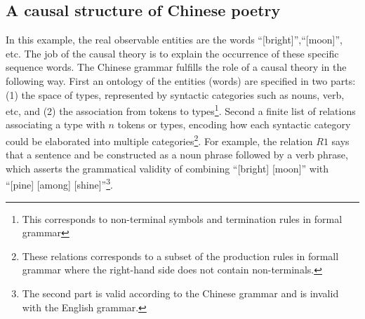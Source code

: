 \subsection{A causal structure of Chinese poetry}

In this example, the real observable entities are the words ``[bright]'',``[moon]'', etc. The job of the causal theory is to explain the occurrence of these specific sequence words. The Chinese grammar fulfills the role of a causal theory in the following way. First an ontology of the entities (words) are specified in two parts: (1) the space of types, represented by syntactic categories such as nouns, verb, etc, and (2) the association from tokens to types\footnote{This corresponds to non-terminal symbols and termination rules in formal grammar}. Second a finite list of relations associating a type with $n$ tokens or types, encoding how each syntactic category could be elaborated into multiple categories\footnote{These relations corresponds to a subset of the production rules in formall grammar where the right-hand side does not contain non-terminals.}. For example, the relation $R1$ says that a sentence and be constructed as a noun phrase followed by a verb phrase, which asserts the grammatical validity of combining ``[bright] [moon]'' with ``[pine] [among] [shine]''\footnote{The second part is valid according to the Chinese grammar and is invalid with the English grammar.}.

\newcommand{\poetryToken}{
    \begin{minipage}{0.3\linewidth}
    \begin{align*}
    \text{bright, clear}\\
    \text{moon, pine, spring, stone}\\
    \text{among, on}\\
    \text{shine, flow}
    \end{align*}
    \end{minipage}
}

\newcommand{\poetryType}{
    {\begin{minipage}{0.1\linewidth}\centering 
        $S$\\
        $NP$ \\ 
        $N$ \\ 
        $Adj$ \\ 
        $Adv$ \\ 
        $Prp$
        \end{minipage}}
}

